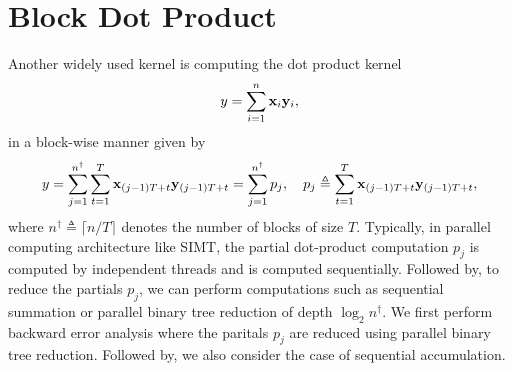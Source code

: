 \documentclass[11pt,draft]{article}
\newcommand{\define}{\ensuremath{\triangleq}}
\newcommand{\vect}[1]{\mathbf{\MakeLowercase{#1}}}
\theoremstyle{definition}
\theoremstyle{remark}
\begin{document}
\section{Block Dot Product}
\label{sec:block_dot_product}
Another widely used kernel is computing the dot product kernel
\begin{align}
    y = \sum_{i=1}^n \vect{x}_i \vect{y}_i,
\end{align}
in a block-wise manner given by
\begin{align}
    y = \sum_{j = 1}^{n^\dagger}\sum_{t=1}^{T} \vect{x}_{(j-1)T + t} \vect{y}_{(j-1)T + t} = \sum_{j=1}^{n^\dagger} p_j, \quad p_j \define \sum_{t=1}^{T} \vect{x}_{(j-1)T + t} \vect{y}_{(j-1)T + t},
\end{align}
where $n^\dagger \define \lceil n / T \rceil$ denotes the number of blocks of size $T$.
Typically, in parallel computing architecture like SIMT, the partial dot-product computation $p_j$ is computed by independent threads and is computed sequentially.
Followed by, to reduce the partials $p_j$, we can perform computations such as sequential summation or parallel binary tree reduction of depth $\log_2 n^\dagger$.
We first perform backward error analysis where the paritals $p_j$ are reduced using parallel binary tree reduction.
Followed by, we also consider the case of sequential accumulation.
\end{document}
